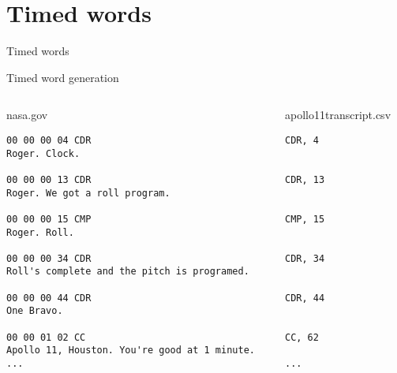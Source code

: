 \section{Timed words}
\begin{frame}[shrink=5]{Timed words}
    \begin{center}
        
    \end{center}
\end{frame}
\begin{frame}[fragile]{Timed word generation}
    \begin{columns}
        \begin{column}{0.6\textwidth}
            nasa.gov
            \begin{lstlisting}[basicstyle=\tiny]
00 00 00 04 CDR
Roger. Clock.

00 00 00 13 CDR
Roger. We got a roll program.

00 00 00 15 CMP
Roger. Roll.

00 00 00 34 CDR
Roll's complete and the pitch is programed.

00 00 00 44 CDR
One Bravo.

00 00 01 02 CC
Apollo 11, Houston. You're good at 1 minute.
...
            \end{lstlisting}
        \end{column}
        \begin{column}{0.4\textwidth}
            apollo11transcript.csv
            \begin{lstlisting}[basicstyle=\tiny]
CDR, 4


CDR, 13


CMP, 15


CDR, 34


CDR, 44


CC, 62

...
            \end{lstlisting}
        \end{column}
    \end{columns}
\end{frame}

